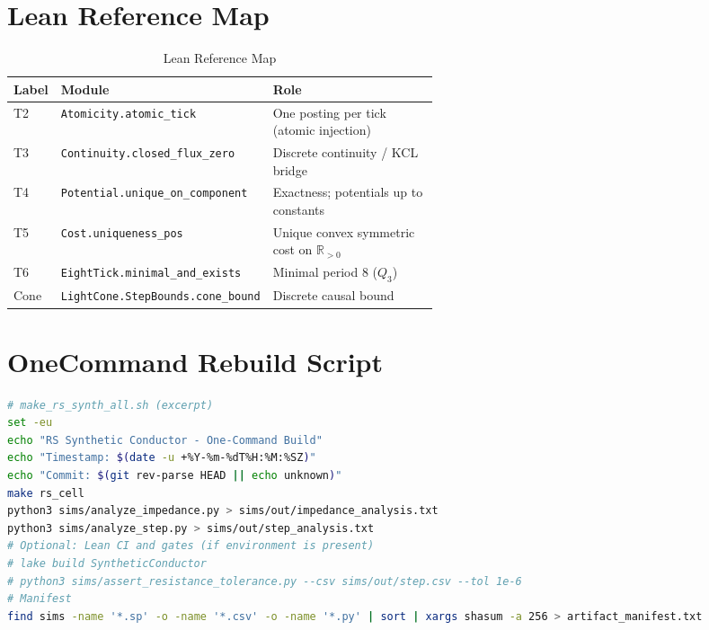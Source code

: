 \documentclass[11pt,a4paper]{article}
\newcommand{\RR}{\mathbb{R}}
\begin{document}
\section{Lean Reference Map}
\label{app:leanmap}
\begin{table}[h]
\caption{Lean Reference Map}
\begin{center}
\begin{tabular}{llp{0.55\linewidth}}
\hline
Label & Module & Role \\
\hline
T2 & \verb|Atomicity.atomic_tick| & One posting per tick (atomic injection) \\
T3 & \verb|Continuity.closed_flux_zero| & Discrete continuity / KCL bridge \\
T4 & \verb|Potential.unique_on_component| & Exactness; potentials up to constants \\
T5 & \verb|Cost.uniqueness_pos| & Unique convex symmetric cost on \(\RR_{>0}\) \\
T6 & \verb|EightTick.minimal_and_exists| & Minimal period 8 (\(Q_3\)) \\
Cone & \verb|LightCone.StepBounds.cone_bound| & Discrete causal bound \\
\hline
\end{tabular}
\end{center}
\end{table}

\section{One\textendash Command Rebuild Script}
\label{app:rebuild}
\begin{lstlisting}[language=bash]
# make_rs_synth_all.sh (excerpt)
set -eu
echo "RS Synthetic Conductor - One-Command Build"
echo "Timestamp: $(date -u +%Y-%m-%dT%H:%M:%SZ)"
echo "Commit: $(git rev-parse HEAD || echo unknown)"
make rs_cell
python3 sims/analyze_impedance.py > sims/out/impedance_analysis.txt
python3 sims/analyze_step.py > sims/out/step_analysis.txt
# Optional: Lean CI and gates (if environment is present)
# lake build SyntheticConductor
# python3 sims/assert_resistance_tolerance.py --csv sims/out/step.csv --tol 1e-6
# Manifest
find sims -name '*.sp' -o -name '*.csv' -o -name '*.py' | sort | xargs shasum -a 256 > artifact_manifest.txt
\end{lstlisting}
\end{document}
